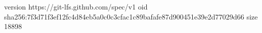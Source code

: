 version https://git-lfs.github.com/spec/v1
oid sha256:7f3d71f3ef12fc4d84eb5a0c0c3cfac1c89bafafe87d900451e39e2d77029d66
size 18898
